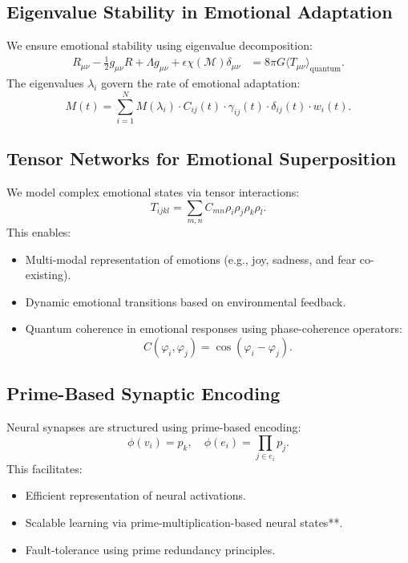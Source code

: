 \documentclass{article}
\theoremstyle{plain}
\begin{document}
\subsection{Eigenvalue Stability in Emotional Adaptation}
We ensure emotional stability using eigenvalue decomposition:
\begin{align}
    R_{\mu \nu} - \frac{1}{2} g_{\mu \nu} R + \Lambda g_{\mu \nu} + \epsilon \chi(\mathcal{M}) \delta_{\mu \nu} &= 8 \pi G \langle T_{\mu \nu} \rangle_{\text{quantum}}.
\end{align}
The eigenvalues \( \lambda_i \) govern the rate of emotional adaptation:
\begin{equation}
    M(t) = \sum_{i=1}^{N} M(\lambda_i) \cdot C_{ij}(t) \cdot \gamma_{ij}(t) \cdot \delta_{ij}(t) \cdot w_i(t).
\end{equation}

\subsection{Tensor Networks for Emotional Superposition}
We model complex emotional states via tensor interactions:
\begin{equation}
    T_{ijkl} = \sum_{m,n} C_{mn} \rho_i \rho_j \rho_k \rho_l.
\end{equation}
This enables:
\begin{itemize}
    \item Multi-modal representation of emotions (e.g., joy, sadness, and fear co-existing).
    \item Dynamic emotional transitions based on environmental feedback.
    \item Quantum coherence in emotional responses using phase-coherence operators:
    \begin{equation}
        C(\varphi_i, \varphi_j) = \cos(\varphi_i - \varphi_j).
    \end{equation}
\end{itemize}

\subsection{Prime-Based Synaptic Encoding}
Neural synapses are structured using prime-based encoding:
\begin{equation}
    \phi(v_i) = p_k, \quad \phi(e_i) = \prod_{j \in e_i} p_j.
\end{equation}
This facilitates:
\begin{itemize}
    \item Efficient representation of neural activations.
    \item Scalable learning via prime-multiplication-based neural states**.
    \item Fault-tolerance using prime redundancy principles.
\end{itemize}
\end{document}
